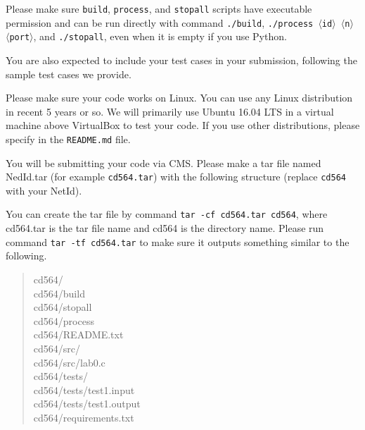 \documentclass[11pt]{article}
\begin{document}
\begin{compactitem}
\begin{compactitem}
            \item Please make sure \texttt{build}, \texttt{process}, and \texttt{stopall} scripts have executable permission and can be run directly with command \texttt{./build}, \texttt{./process    $\langle$id$\rangle$ $\langle$n$\rangle$ $\langle$port$\rangle$}, and \texttt{./stopall}, even when it is empty if you use Python.
        \end{compactitem}

        \item You are also expected to include your test cases in your submission, following the sample test cases we provide.

        \item Please make sure your code works on Linux.
        You can use any Linux distribution in recent 5 years or so.
        We will primarily use Ubuntu 16.04 LTS in a virtual machine above VirtualBox to test your code.
        If you use other distributions, please specify in the \texttt{README.md} file.

    \end{compactitem}

    You will be submitting your code via CMS.
    Please make a tar file named NedId.tar (for example \texttt{cd564.tar}) with the following structure (replace \texttt{cd564} with your NetId).


    You can create the tar file by command \texttt{tar -cf cd564.tar cd564}, where cd564.tar is the tar file name and cd564 is the directory name.
    Please run command \texttt{tar -tf cd564.tar} to make sure it outputs something similar to the following.

    \begin{quote}
        cd564/\\
        cd564/build\\
        cd564/stopall\\
        cd564/process\\
        cd564/README.txt\\
        cd564/src/\\
        cd564/src/lab0.c\\
        cd564/tests/\\
        cd564/tests/test1.input\\
        cd564/tests/test1.output\\
        cd564/requirements.txt\\
    \end{quote}
\end{document}
